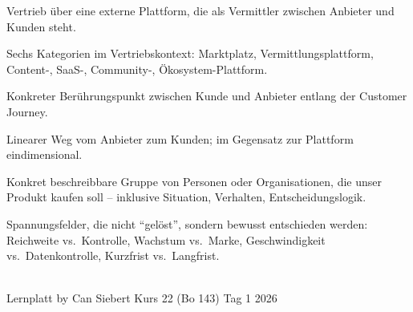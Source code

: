 \documentclass[11pt,a4paper,oneside]{article}
\begin{document}
\begin{description}[style=nextline,leftmargin=0pt,labelindent=0pt,itemsep=4pt]
  \item[Plattformbasierter Vertrieb] Vertrieb über eine externe Plattform, die als Vermittler zwischen Anbieter und Kunden steht.
  \item[Plattformtypen] Sechs Kategorien im Vertriebskontext: Marktplatz, Vermittlungsplattform, Content-, SaaS-, Community-, Ökosystem-Plattform.
  \item[Touchpoint] Konkreter Berührungspunkt zwischen Kunde und Anbieter entlang der Customer Journey.
  \item[Vertriebskanal] Linearer Weg vom Anbieter zum Kunden; im Gegensatz zur Plattform eindimensional.
  \item[Zielgruppe] Konkret beschreibbare Gruppe von Personen oder Organisationen, die unser Produkt kaufen soll -- inklusive Situation, Verhalten, Entscheidungslogik.
  \item[Zielkonflikte (digitaler Vertrieb)] Spannungsfelder, die nicht ``gelöst'', sondern bewusst entschieden werden: Reichweite vs.\ Kontrolle, Wachstum vs.\ Marke, Geschwindigkeit vs.\ Datenkontrolle, Kurzfrist vs.\ Langfrist.
\end{description}

\vspace{1cm}
\noindent{\color{lpAccent}\rule{\linewidth}{0.6pt}}\\[4pt]
{\footnotesize\sffamily\color{lpGray}Lernplatt \textperiodcentered{} by Can Siebert \textperiodcentered{} Kurs 22 (Bo 143) \textperiodcentered{} Tag 1 \textperiodcentered{} \textcopyright{} 2026}
\end{document}
